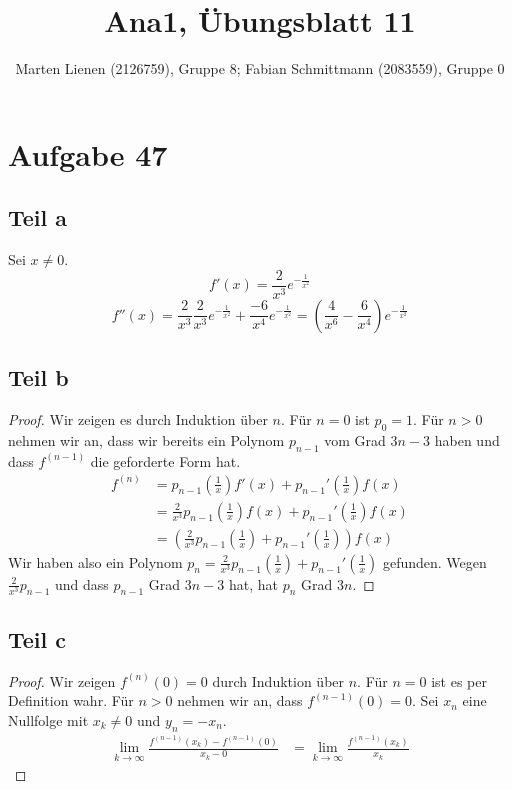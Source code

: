 \documentclass[a4paper,10pt]{article}
\title{Ana1, Übungsblatt 11}
\author{Marten Lienen (2126759), Gruppe 8; Fabian Schmittmann (2083559), Gruppe 0}
\begin{document}
\maketitle

\section*{Aufgabe 47}

\subsection*{Teil a}

Sei $x \ne 0$.
\begin{equation}
 f'(x) = \frac{2}{x^3} e^{-\frac{1}{x^2}}
\end{equation}
\begin{equation}
 f''(x) = \frac{2}{x^3} \frac{2}{x^3} e^{-\frac{1}{x^2}} + \frac{-6}{x^4} e^{-\frac{1}{x^2}} = (\frac{4}{x^6} - \frac{6}{x^4}) e^{-\frac{1}{x^2}}
\end{equation}

\subsection*{Teil b}

\begin{proof}
 Wir zeigen es durch Induktion über $n$.
 Für $n = 0$ ist $p_0 = 1$.
 Für $n > 0$ nehmen wir an, dass wir bereits ein Polynom $p_{n - 1}$ vom Grad $3n - 3$ haben und dass $f^{(n - 1)}$ die geforderte Form hat.
 \begin{align*}
  f^{(n)} & = p_{n - 1}(\frac{1}{x}) f'(x) + p_{n - 1}'(\frac{1}{x}) f(x)\\
  & = \frac{2}{x^3} p_{n - 1}(\frac{1}{x}) f(x) + p_{n - 1}'(\frac{1}{x}) f(x)\\
  & = \left( \frac{2}{x^3} p_{n - 1}(\frac{1}{x}) + p_{n - 1}'(\frac{1}{x}) \right) f(x)
 \end{align*}
 Wir haben also ein Polynom $p_n = \frac{2}{x^3} p_{n - 1}(\frac{1}{x}) + p_{n - 1}'(\frac{1}{x})$ gefunden.
 Wegen $\frac{2}{x^3} p_{n - 1}$ und dass $p_{n - 1}$ Grad $3n - 3$ hat, hat $p_n$ Grad $3n$.
\end{proof}

\subsection*{Teil c}

\begin{proof}
 Wir zeigen $f^{(n)}(0) = 0$ durch Induktion über $n$.
 Für $n = 0$ ist es per Definition wahr.
 Für $n > 0$ nehmen wir an, dass $f^{(n - 1)}(0) = 0$.
 Sei $x_n$ eine Nullfolge mit $x_k \ne 0$ und $y_n = -x_n$.
 \begin{align*}
  \lim_{k \rightarrow \infty} \frac{f^{(n - 1)}(x_k) - f^{(n - 1)}(0)}{x_k - 0} & = \lim_{k \rightarrow \infty} \frac{f^{(n - 1)}(x_k)}{x_k}
 \end{align*}

\end{proof}
\end{document}

